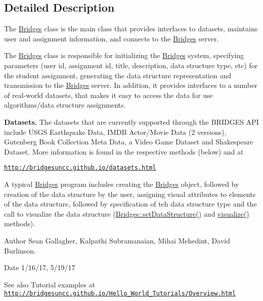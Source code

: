 \subsection{Detailed Description}
The \hyperlink{classbridges_1_1connect_1_1_bridges}{Bridges} class is the main class that provides interfaces to datasets, maintains user and assignment information, and connects to the \hyperlink{classbridges_1_1connect_1_1_bridges}{Bridges} server. 

The \hyperlink{classbridges_1_1connect_1_1_bridges}{Bridges} class is responsible for initializing the \hyperlink{classbridges_1_1connect_1_1_bridges}{Bridges} system, specifying parameters (user id, assignment id, title, description, data structure type, etc) for the student assignment, generating the data structure representation and transmission to the \hyperlink{classbridges_1_1connect_1_1_bridges}{Bridges} server. In addition, it provides interfaces to a number of real-\/world datasets, that makes it easy to access the data for use algorithms/data structure assignments. ~\newline


{\bfseries Datasets.} The datasets that are currently supported through the B\+R\+I\+D\+G\+E\+S A\+P\+I include U\+S\+G\+S Earthquake Data, I\+M\+D\+B Actor/\+Movie Data (2 versions), Gutenberg Book Collection Meta Data, a Video Game Dataset and Shakespeare Dataset. More information is found in the respective methods (below) and at 

\href{http://bridgesuncc.github.io/datasets.html}{\tt http\+://bridgesuncc.\+github.\+io/datasets.\+html} 

A typical \hyperlink{classbridges_1_1connect_1_1_bridges}{Bridges} program includes creating the \hyperlink{classbridges_1_1connect_1_1_bridges}{Bridges} object, followed by creation of the data structure by the user, assigning visual attributes to elements of the data structure, followed by specification of teh data structure type and the call to visualize the data structure (\hyperlink{classbridges_1_1connect_1_1_bridges_a921a6603b2445b1abe30a1b3d6f0c255}{Bridges\+::set\+Data\+Structure()} and \hyperlink{classbridges_1_1connect_1_1_bridges_a1853d64ffb8675ba2ec227a2b819cd24}{visualize()} methods).

\begin{DoxyAuthor}{Author}
Sean Gallagher, Kalpathi Subramanaian, Mihai Mehedint, David Burlinson.
\end{DoxyAuthor}
\begin{DoxyDate}{Date}
1/16/17, 5/19/17
\end{DoxyDate}
\begin{DoxySeeAlso}{See also}
Tutorial examples at ~\newline
 \href{http://bridgesuncc.github.io/Hello_World_Tutorials/Overview.html}{\tt http\+://bridgesuncc.\+github.\+io/\+Hello\+\_\+\+World\+\_\+\+Tutorials/\+Overview.\+html} 
\end{DoxySeeAlso}



